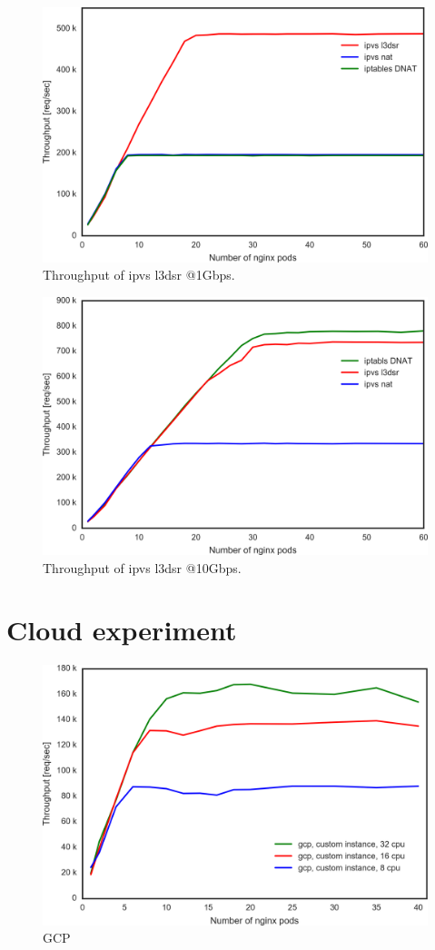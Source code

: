 \begin{figure}[t]
  \centering
  \includegraphics[width=0.8\columnwidth]{Figs/ipvs_l3dsr_1g.png}
  \caption{Throughput of ipvs l3dsr @1Gbps.}
  \label{fig:ipvs_l3dsr_1g.png}
\end{figure}

\begin{figure}[t]
  \centering
  \includegraphics[width=0.8\columnwidth]{Figs/ipvs_l3dsr_10g.png}
  \caption{Throughput of ipvs l3dsr @10Gbps.}
  \label{fig:ipvs_l3dsr_10g.png}
\end{figure}

\section{Cloud experiment}

\begin{figure}[t]
  \centering
  \includegraphics[width=0.8\columnwidth]{Figs/gcp_all_tp}
  \caption{GCP}
  \label{fig:gcp_all_ieice}
\end{figure}

